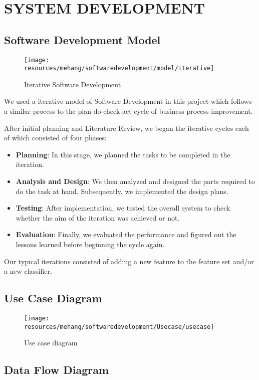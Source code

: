 \newpage
\section{SYSTEM DEVELOPMENT}
\subsection{Software Development Model}
\begin{figure}[h!]
        \centering
        \texttt{[image: resources/mehang/softwaredevelopment/model/iterative]}
        \caption{Iterative Software Development}
\end{figure}

We used a iterative model of Software Development in this project which follows a similar process to the plan-do-check-act cycle of business process improvement.

After initial planning and Literature Review, we began the iterative cycles each of which consisted of four phases:
\begin{itemize}
    \item \textbf{Planning}: In this stage, we planned the tasks to be completed in the iteration.
    \item \textbf{Analysis and Design}: We then analyzed and designed the parts required to do the task at hand. 
                      Subsequently, we implemented the design plans.
    \item \textbf{Testing}: After implementation, we tested the overall system to check whether the aim of the iteration was achieved or not. 
    \item \textbf{Evaluation}: Finally, we evaluated the performance and figured out the lessons learned before beginning the cycle again.
\end{itemize}

Our typical iterations consisted of adding a new feature to the feature set and/or a new classifier.

\newpage
\subsection{Use Case Diagram}
\begin{figure}[h!]
        \centering
        \texttt{[image: resources/mehang/softwaredevelopment/Usecase/usecase]}
        \caption{Use case diagram}
\end{figure}
\newpage
\subsection{Data Flow Diagram}
